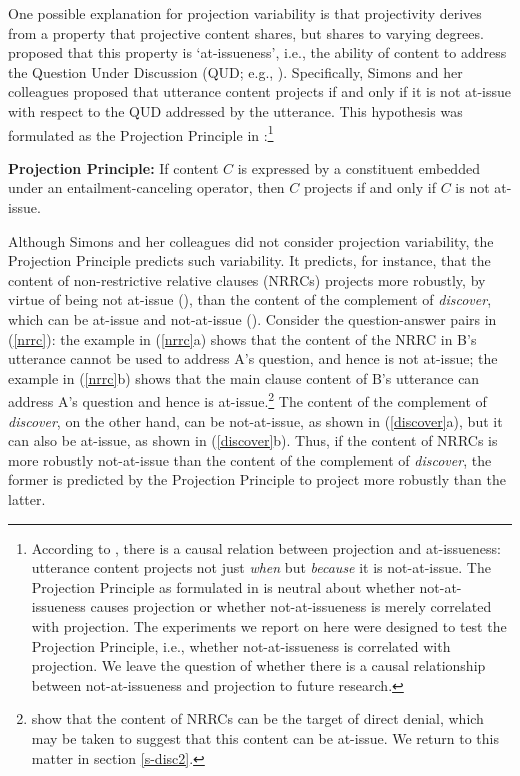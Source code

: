 \documentclass[11pt,fleqn]{article}
\newcommand{\6}{\mbox{$[\hspace*{-.6mm}[$}}
\newcommand{\9}{\mbox{$]\hspace*{-.6mm}]$}}
\begin{document}
One possible explanation for projection variability is that projectivity derives from a property that projective content shares, but shares to varying degrees. \citet{brst-salt10} proposed that this property is `at-issueness', i.e., the ability of content to address the Question Under Discussion (QUD; e.g., \citealt{roberts12}).  Specifically, Simons and her colleagues proposed that utterance content projects if and only if it is not at-issue with respect to the QUD addressed by the utterance. This hypothesis was formulated as the Projection Principle in \citealt[280]{brst-ar}:\footnote{According to \citealt[315]{brst-salt10}, there is a causal relation between projection and at-issueness: utterance content projects not just {\em when} but {\em because} it is not-at-issue. The Projection Principle as formulated in \citealt{brst-ar} is neutral about whether not-at-issueness causes projection or whether not-at-issueness is merely correlated with projection. The experiments we report on here were designed to test the Projection Principle, i.e., whether not-at-issueness is correlated with projection. We leave the question of whether there is a causal relationship between not-at-issueness and projection to future research.}

\begin{exe}
\ex\label{pp} {\bf Projection Principle:} If content $C$ is expressed by a constituent embedded under an entailment-canceling operator, then $C$ projects if and only if $C$ is not at-issue.

\end{exe} 
Although Simons and her colleagues did not consider projection variability, the Projection Principle predicts such variability. It predicts, for instance, that the content of non-restrictive relative clauses (NRRCs) projects more robustly, by virtue of being not at-issue (\citealt{potts05}), than the content of the complement of {\em discover}, which can be at-issue and not-at-issue (\citealt{simons07}). Consider the question-answer pairs in (\ref{nrrc}): the example in (\ref{nrrc}a) shows that the content of the NRRC in B's utterance cannot be used to address A's question, and hence is not at-issue; the example in (\ref{nrrc}b) shows that the main clause content of B's utterance can address A's question and hence is at-issue.\footnote{\citet{syrett-koev2015} show that the content of NRRCs can be the target of direct denial, which may be taken to suggest that this content can be at-issue. We return to this matter in section \ref{s-disc2}.}  The content of the complement of {\em discover}, on the other hand, can be not-at-issue, as shown in (\ref{discover}a), but it can also be at-issue, as shown in (\ref{discover}b). Thus, if the content of NRRCs is more robustly not-at-issue than the content of the complement of {\em discover}, the former is predicted by the Projection Principle to project more robustly than the latter. 
\end{document}
